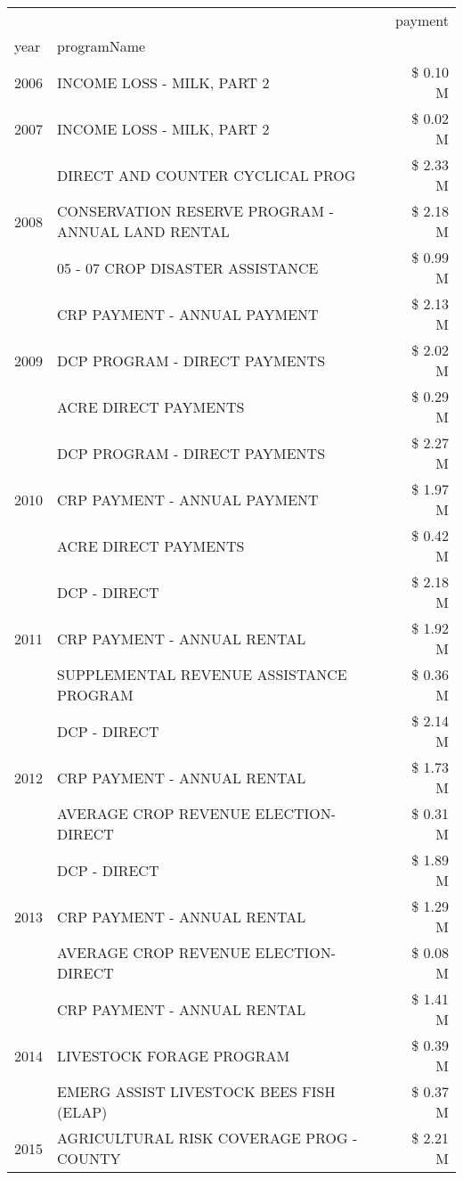 \begin{tabular}{llr}
\toprule
 &  & payment \\
year & programName &  \\
\midrule
2006 & INCOME LOSS - MILK, PART 2 & \$ 0.10 M \\
\cline{1-3}
2007 & INCOME LOSS - MILK, PART 2 & \$ 0.02 M \\
\cline{1-3}
\multirow[t]{3}{*}{2008} & DIRECT AND COUNTER CYCLICAL PROG & \$ 2.33 M \\
 & CONSERVATION RESERVE PROGRAM - ANNUAL LAND RENTAL & \$ 2.18 M \\
 & 05 - 07 CROP DISASTER ASSISTANCE & \$ 0.99 M \\
\cline{1-3}
\multirow[t]{3}{*}{2009} & CRP PAYMENT - ANNUAL PAYMENT & \$ 2.13 M \\
 & DCP PROGRAM - DIRECT PAYMENTS & \$ 2.02 M \\
 & ACRE DIRECT PAYMENTS & \$ 0.29 M \\
\cline{1-3}
\multirow[t]{3}{*}{2010} & DCP PROGRAM - DIRECT PAYMENTS & \$ 2.27 M \\
 & CRP PAYMENT - ANNUAL PAYMENT & \$ 1.97 M \\
 & ACRE DIRECT PAYMENTS & \$ 0.42 M \\
\cline{1-3}
\multirow[t]{3}{*}{2011} & DCP - DIRECT & \$ 2.18 M \\
 & CRP PAYMENT - ANNUAL RENTAL & \$ 1.92 M \\
 & SUPPLEMENTAL REVENUE ASSISTANCE PROGRAM & \$ 0.36 M \\
\cline{1-3}
\multirow[t]{3}{*}{2012} & DCP - DIRECT & \$ 2.14 M \\
 & CRP PAYMENT - ANNUAL RENTAL & \$ 1.73 M \\
 & AVERAGE CROP REVENUE ELECTION-DIRECT & \$ 0.31 M \\
\cline{1-3}
\multirow[t]{3}{*}{2013} & DCP - DIRECT & \$ 1.89 M \\
 & CRP PAYMENT - ANNUAL RENTAL & \$ 1.29 M \\
 & AVERAGE CROP REVENUE ELECTION-DIRECT & \$ 0.08 M \\
\cline{1-3}
\multirow[t]{3}{*}{2014} & CRP PAYMENT - ANNUAL RENTAL & \$ 1.41 M \\
 & LIVESTOCK FORAGE PROGRAM & \$ 0.39 M \\
 & EMERG ASSIST LIVESTOCK BEES FISH (ELAP) & \$ 0.37 M \\
\cline{1-3}
\multirow[t]{3}{*}{2015} & AGRICULTURAL RISK COVERAGE PROG - COUNTY & \$ 2.21 M \\

\end{tabular}
